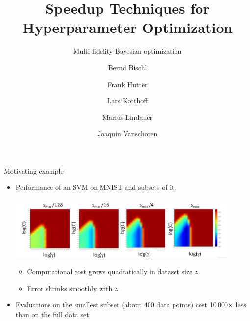 

\title{Speedup Techniques for Hyperparameter Optimization}
\subtitle{Multi-fidelity Bayesian optimization}
\author[Frank Hutter]{Bernd Bischl \and \underline{Frank Hutter} \and Lars Kotthoff\newline \and Marius Lindauer \and Joaquin Vanschoren}
\institute{}
\date{}




\maketitle

\begin{frame}[c]{Motivating example}

\begin{itemize}
    \item Performance of an SVM on MNIST and subsets of it:\\~\\
	    \includegraphics[width=0.9\textwidth]{../w07_hpo_speedup/images/fabolas/example_mnist.jpg}
	    \begin{itemize}
            \item Computational cost grows quadratically in dataset size $z$
            \item Error shrinks smoothly with $z$
        \end{itemize}
	\item Evaluations on the smallest subset (about 400 data points) cost 10\,000$\times$ less than on the full data set
    
\end{itemize}
\end{frame}

